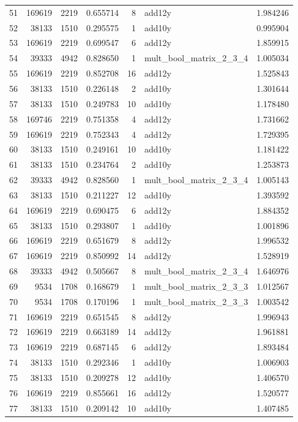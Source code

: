 \begin{tabular}{lrrrrlr}
51 & 169619 & 2219 & 0.655714 & 8 & add12y & 1.984246 \\
52 & 38133 & 1510 & 0.295575 & 1 & add10y & 0.995904 \\
53 & 169619 & 2219 & 0.699547 & 6 & add12y & 1.859915 \\
54 & 39333 & 4942 & 0.828650 & 1 & mult_bool_matrix_2_3_4 & 1.005034 \\
55 & 169619 & 2219 & 0.852708 & 16 & add12y & 1.525843 \\
56 & 38133 & 1510 & 0.226148 & 2 & add10y & 1.301644 \\
57 & 38133 & 1510 & 0.249783 & 10 & add10y & 1.178480 \\
58 & 169746 & 2219 & 0.751358 & 4 & add12y & 1.731662 \\
59 & 169619 & 2219 & 0.752343 & 4 & add12y & 1.729395 \\
60 & 38133 & 1510 & 0.249161 & 10 & add10y & 1.181422 \\
61 & 38133 & 1510 & 0.234764 & 2 & add10y & 1.253873 \\
62 & 39333 & 4942 & 0.828560 & 1 & mult_bool_matrix_2_3_4 & 1.005143 \\
63 & 38133 & 1510 & 0.211227 & 12 & add10y & 1.393592 \\
64 & 169619 & 2219 & 0.690475 & 6 & add12y & 1.884352 \\
65 & 38133 & 1510 & 0.293807 & 1 & add10y & 1.001896 \\
66 & 169619 & 2219 & 0.651679 & 8 & add12y & 1.996532 \\
67 & 169619 & 2219 & 0.850992 & 14 & add12y & 1.528919 \\
68 & 39333 & 4942 & 0.505667 & 8 & mult_bool_matrix_2_3_4 & 1.646976 \\
69 & 9534 & 1708 & 0.168679 & 1 & mult_bool_matrix_2_3_3 & 1.012567 \\
70 & 9534 & 1708 & 0.170196 & 1 & mult_bool_matrix_2_3_3 & 1.003542 \\
71 & 169619 & 2219 & 0.651545 & 8 & add12y & 1.996943 \\
72 & 169619 & 2219 & 0.663189 & 14 & add12y & 1.961881 \\
73 & 169619 & 2219 & 0.687145 & 6 & add12y & 1.893484 \\
74 & 38133 & 1510 & 0.292346 & 1 & add10y & 1.006903 \\
75 & 38133 & 1510 & 0.209278 & 12 & add10y & 1.406570 \\
76 & 169619 & 2219 & 0.855661 & 16 & add12y & 1.520577 \\
77 & 38133 & 1510 & 0.209142 & 10 & add10y & 1.407485 \\

\end{tabular}
